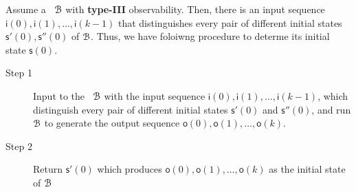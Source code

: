 
Assume a \BCN\ ${\mathcal{B}}$  with {\bf type-III}  observability. Then, there is an input sequence $\mathsf{i}(0),\mathsf{i}(1),\ldots, \mathsf{i}(k-1)$ that distinguishes every pair of different initial states $\mathsf{s}'(0), \mathsf{s}''(0)$ of ${\mathcal{B}}$. Thus, we have foloiwng procedure to determe its initial state $\mathsf{s}(0)$.

 \begin{description}
	\item[Step 1]  Input to the \BCN\ ${\mathcal{B}}$ with the input sequence $\mathsf{i}(0),\mathsf{i}(1),\ldots, \mathsf{i}(k-1)$, which distinguish every pair of different initial states $\mathsf{s}'(0)$ and $\mathsf{s}''(0)$, and run ${\mathcal{B}}$ to generate the output sequence $\mathsf{o}(0),\mathsf{o}(1),\ldots,\mathsf{o}(k)$.
	\item[Step 2] Return $\mathsf{s}'(0)$ which produces $\mathsf{o}(0),\mathsf{o}(1),\ldots,\mathsf{o}(k)$ as the initial state of ${\mathcal{B}}$ 
\end{description}

